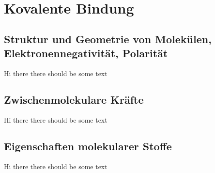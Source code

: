 \section{Kovalente Bindung}

\subsection{Struktur und Geometrie von Molekülen, Elektronennegativität, Polarität}

Hi there there should be some text

\subsection{Zwischenmolekulare Kräfte}
Hi there there should be some text

\subsection{Eigenschaften molekularer Stoffe}
Hi there there should be some text